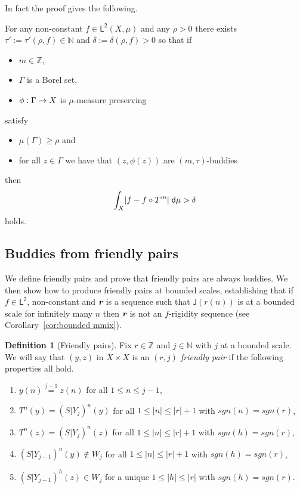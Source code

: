 \documentclass[10pt]{amsart}
\theoremstyle{definition}\newtheorem{defi}[theo]{Definition}\newtheorem{rema}[theo]{Remark}\newtheorem{exam}[theo]{Example}\newtheorem{exem}[theo]{Example}\newtheorem{nota}[theo]{Notation}
\newcommand{\N}{\mathbb{N}}
\newcommand{\Z}{\mathbb{Z}}
\newcommand{\intd}{\;\mathsf{d}}
\newcommand{\lp}{\mathsf{L}}
\newcommand{\ltwo}{\lp^{\!\mathsf{2}}}
\newcommand{\scl}{\mathsf{J}}
\def\mathbi#1{\textbf{\em #1}}
\newcommand{\bir}{\mathbi{r}}
\let\originalleft\left
\let\originalright\right
\renewcommand{\left}{\mathopen{}\mathclose\bgroup\originalleft}
\renewcommand{\right}{\aftergroup\egroup\originalright}
\renewcommand*{\to}{\mathchoice{\longrightarrow}{\rightarrow}{\rightarrow}{\rightarrow}}
\newcommand*{\relabel}{\renewcommand{\labelenumi}{(\theenumi)}}
\newcommand*{\Fenumi}{\renewcommand*{\theenumi}{F\arabic{enumi}}\relabel}
\begin{document}
In fact the proof gives the following.

\begin{coro}\label{cor:end}
For any non-constant $f \in \ltwo(X,\mu)$ and any $\rho > 0$ there exists $\tau':=\tau'(\rho,f) \in \N$ and $\delta:=\delta(\rho,f)>0$ so that if
\begin{itemize}
\item $m \in \Z$,
\item $\Gamma$ is a Borel set,
\item $\phi:\Gamma \to X$ is $\mu$-measure preserving
\end{itemize}
satisfy
\begin{itemize}
\item $\mu(\Gamma)\geq \rho$ and
\item for all $z \in \Gamma$ we have that $(z,\phi(z))$ are $(m,\tau)$-buddies
\end{itemize}
then
\[
\int_X \left|f -f\circ T^m\right| \intd\mu>\delta
\]
holds.
\end{coro}



\subsection{Buddies from friendly pairs}\label{subsec:buddies from pairs}

We define friendly pairs and prove that friendly pairs are always buddies. We then show how to produce friendly pairs at bounded scales, establishing that if $f\in \ltwo$, non-constant and $\bir$ is a sequence such that $\scl(r(n))$ is at a bounded scale for infinitely many $n$ then $\bir$ is not an $f$-rigidity sequence (see Corollary~\ref{cor:bounded mmix}).

\begin{defi}
[Friendly pairs]\label{def:friends}
Fix $r \in \Z$ and $j \in \N$ with $j$ at a bounded scale. We will say that $(y,z)$ in $X \times X$ is an
\emph{$(r,j)$ friendly pair} if the following properties all hold.
\begin{enumerate}\Fenumi
\item \label{cond:start same}
$y(n) \overset{j-1}{=} z(n)$ for all $1 \le n \le j-1$,
\item \label{cond:T defined 1}
$T^n(y)= (S|Y_j)^n(y)$ for all $1 \le |n| \le |r|+1$ with $sgn(n)=sgn(r)$,
\item \label{cond:T defined 2}
$T^n(z) = (S|Y_j)^n(z)$ for all $1 \le |n| \le |r|+1$ with $sgn(h)=sgn(r)$,
\item \label{cond:friend miss}
$(S|Y_{j-1})^n(y) \not\in W_j$ for all $1 \le |n| \le |r|+1$ with $sgn(h)=sgn(r)$,
\item \label{cond:friend hit}
$(S|Y_{j-1})^h(z) \in W_j$ for a unique $1 \le |h| \le |r|$ with $sgn(h)=sgn(r)$.
\end{enumerate}
\end{defi}
\end{document}
